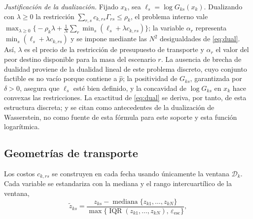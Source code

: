 \emph{Justificación de la dualización.} Fijado $x_k$, sea $\ell_s=\log G_{ks}(x_k)$. Dualizando con $\lambda\ge0$ la restricción $\sum_{r,s}c_{k,rs}\Gamma_{rs}\le\rho_k$, el problema interno vale $\max_{\lambda\ge0}\bigl\{-\rho_k\lambda+\tfrac1N\sum_{r}\min_{s}(\ell_s+\lambda c_{k,rs})\bigr\}$; la variable $\alpha_r$ representa $\min_s(\ell_s+\lambda c_{k,rs})$ y se impone mediante las $N^2$ desigualdades de \eqref{eq:dual}. Así, $\lambda$ es el precio de la restricción de presupuesto de transporte y $\alpha_r$ el valor del peor destino disponible para la masa del escenario $r$. La ausencia de brecha de dualidad proviene de la dualidad lineal de este problema discreto, cuyo conjunto factible es no vacío porque contiene a $\hat p$; la positividad de $G_{ks}$, garantizada por $\delta>0$, asegura que $\ell_s$ esté bien definido, y la concavidad de $\log G_{ks}$ en $x_k$ hace convexas las restricciones. La exactitud de \eqref{eq:dual} se deriva, por tanto, de esta estructura discreta; \citet{mohajerin2018} y \citet{kuhn2019} se citan como antecedentes de la dualización de Wasserstein, no como fuente de esta fórmula para este soporte y esta función logarítmica.


\subsection{Geometrías de transporte}\label{sec:geom}

Los costos $c_{k,rs}$ se construyen en cada fecha usando únicamente la ventana $\mathcal D_k$. Cada variable se estandariza con la mediana y el rango intercuartílico de la ventana,
\begin{equation}\label{eq:std}
\tilde z_{ks}=\frac{z_{ks}-\operatorname{mediana}\{z_{k1},\dots,z_{kN}\}}{\max\{\operatorname{IQR}(z_{k1},\dots,z_{kN}),\,\varepsilon_{\mathrm{esc}}\}},
\end{equation}

